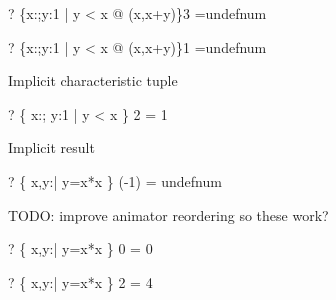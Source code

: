 \documentclass{article}
\newcommand{\negate}{-}
\begin{document}
\begin{zed}\vdash? \{x:\nat;y:1  | y < x @ (x,x+y)\}3 =undefnum\end{zed}
\begin{zed}\vdash? \{x:\nat;y:1  | y < x @ (x,x+y)\}1 =undefnum\end{zed}
Implicit characteristic tuple
\begin{zed} \vdash?   \{ x:\nat; y:1  | y < x \} 2 = 1 \end{zed}
Implicit result
\begin{zed} \vdash?  \{ x,y:\nat | y=x*x \} (\negate1) = undefnum \end{zed}
TODO: improve animator reordering so these work?
\begin{zed} \vdash?   \{ x,y:\nat | y=x*x \} 0 = 0 \end{zed}
\begin{zed} \vdash?   \{ x,y:\nat | y=x*x \} 2 = 4 \end{zed}
\end{document}
